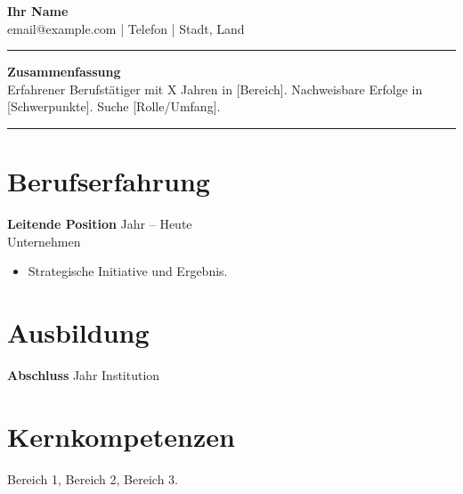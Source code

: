 \documentclass[11pt,a4paper]{article}
\begin{document}
\begin{center}
{\LARGE \textbf{Ihr Name}}\\[0.2em]
email@example.com \quad | \quad Telefon \quad | \quad Stadt, Land
\end{center}
\begin{flushright}\rule{2cm}{2.5cm}\end{flushright}
\vspace{0.4em}
\noindent\textbf{Zusammenfassung}\\
Erfahrener Berufstätiger mit X Jahren in [Bereich]. Nachweisbare Erfolge in [Schwerpunkte]. Suche [Rolle/Umfang].

\vspace{0.5em}
\noindent\rule{\textwidth}{0.4pt}
\section*{Berufserfahrung}
\textbf{Leitende Position} \hfill Jahr -- Heute \\
Unternehmen \\
\begin{itemize}
  \item Strategische Initiative und Ergebnis.
\end{itemize}
\section*{Ausbildung}
\textbf{Abschluss} \hfill Jahr \quad Institution
\section*{Kernkompetenzen}
Bereich 1, Bereich 2, Bereich 3.
\end{document}
